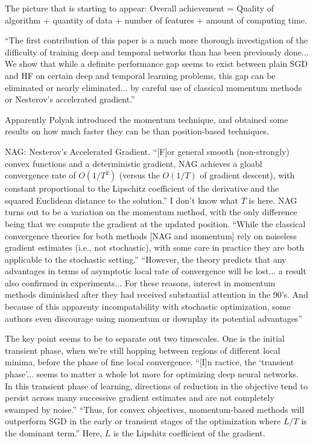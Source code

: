 \documentclass[12pt]{report}
\begin{document}
The picture that is starting to appear: Overall achievement = Quality
of algorithm + quantity of data + number of features + amount of
computing time.

``The first contribution of this paper is a much more thorough
investigation of the difficulty of training deep and temporal networks
than has been previously done... We show that while a definite
performance gap seems to exist between plain SGD and HF on certain
deep and temporal learning problems, this gap can be eliminated or
nearly eliminated... by careful use of classical momentum methods or
Nesterov's accelerated gradient.''

Apparently Polyak introduced the momentum technique, and obtained some
results on how much faster they can be than position-based techniques.

NAG: Nesterov's Accelerated Gradient.  ``[F]or general smooth
(non-strongly) convex functions and a deterministic gradient, NAG
achieves a gloabl convergence rate of $O(1/T^2)$ (versus the $O(1/T)$
of gradient descent), with constant proportional to the Lipschitz
coefficient of the derivative and the squared Euclidean distance to
the solution.''  I don't know what $T$ is here.  NAG turns out to be a
variation on the momentum method, with the only difference being that
we compute the gradient at the updated position.  ``While the
classical convergence theories for both methods [NAG and momentum]
rely on noiseless gradient estimates (i.e., not stochastic), with some
care in practice they are both applicable to the stochastic setting.''
``However, the theory predicts that any advantages in terms of
asymptotic local rate of convergence will be lost... a result also
confirmed in experiments... For these reasons, interest in momentum
methods diminished after they had received substantial attention in
the 90's.  And because of this apparenty incompatability with
stochastic optimization, some authors even discourage using momentum
or downplay its potential advantages''

The key point seems to be to separate out two timescales.  One is the
initial transient phase, when we're still hopping between regions of
different local minima, before the phase of fine local convergence.
``[I]n ractice, the `transient phase'... seems to matter a whole lot
more for optimizing deep neural networks.  In this transient phase of
learning, directions of reduction in the objective tend to persist
across many successive gradient estimates and are not completely
swamped by noise.''  ``Thus, for convex objectives, momentum-based
methods will outperform SGD in the early or transient stages of the
optimization where $L/T$ is the dominant term.''  Here, $L$ is the
Lipshitz coefficient of the gradient.
\end{document}
